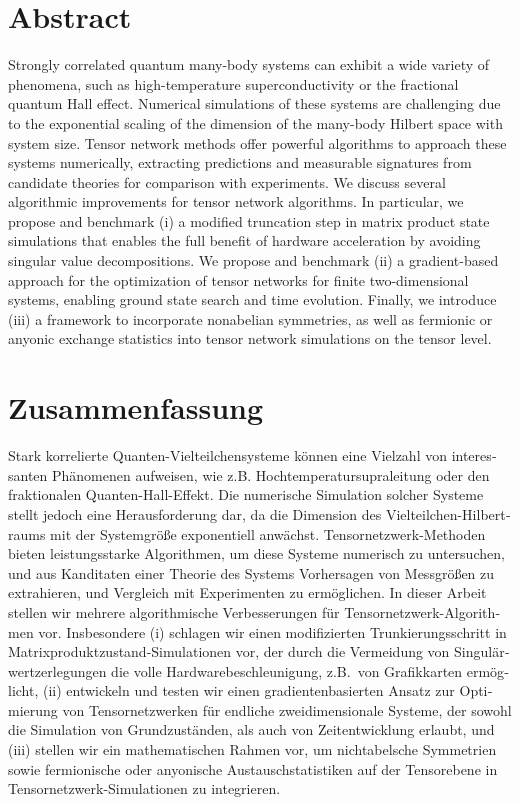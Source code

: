\chapter{Abstract}

Strongly correlated quantum many-body systems can exhibit a wide variety of phenomena, such as high-temperature superconductivity or the fractional quantum Hall effect.
%
Numerical simulations of these systems are challenging due to the exponential scaling of the dimension of the many-body Hilbert space with system size.
%
Tensor network methods offer powerful algorithms to approach these systems numerically, extracting predictions and measurable signatures from candidate theories for comparison with experiments.
%
We discuss several algorithmic improvements for tensor network algorithms.
%
In particular, we propose and benchmark (i) a modified truncation step in matrix product state simulations that enables the full benefit of hardware acceleration by avoiding singular value decompositions.
%
We propose and benchmark (ii) a gradient-based approach for the optimization of tensor networks for finite two-dimensional systems, enabling ground state search and time evolution.
%
Finally, we introduce (iii) a framework to incorporate nonabelian symmetries, as well as fermionic or anyonic exchange statistics into tensor network simulations on the tensor level.


\chapter{Zusammenfassung}

\begin{otherlanguage}{german}
    Stark korrelierte Quanten-Vielteilchensysteme können eine Vielzahl von interessanten Phänomenen aufweisen, wie z.B. Hochtemperatursupraleitung oder den fraktionalen Quanten-Hall-Effekt.
    Die numerische Simulation solcher Systeme stellt jedoch eine Herausforderung dar, da die Dimension des Vielteilchen-Hilbertraums mit der Systemgröße exponentiell anwächst.
    Tensornetzwerk-Methoden bieten leistungsstarke Algorithmen, um diese Systeme numerisch zu untersuchen, und aus Kanditaten einer Theorie des Systems Vorhersagen von Messgrößen zu extrahieren, und Vergleich mit Experimenten zu ermöglichen.
    In dieser Arbeit stellen wir mehrere algorithmische Verbesserungen für Ten\-sor\-netz\-werk-Al\-go\-rith\-men vor.
    Insbesondere (i) schlagen wir einen modifizierten Trunkierungsschritt in Ma\-trix\-pro\-dukt\-zu\-stand-Simulationen vor, der durch die Vermeidung von Singulärwertzerlegungen die volle Hardwarebeschleunigung, z.B.~von Grafikkarten ermöglicht, (ii) entwickeln und testen wir einen gradientenbasierten Ansatz zur Optimierung von Tensornetzwerken für endliche zweidimensionale Systeme, der sowohl die Simulation von Grundzuständen, als auch von Zeitentwicklung erlaubt, und (iii) stellen wir ein mathematischen Rahmen vor, um nichtabelsche Symmetrien sowie fermionische oder anyonische Austauschstatistiken auf der Tensorebene in Tensornetzwerk-Simulationen zu integrieren.
\end{otherlanguage}